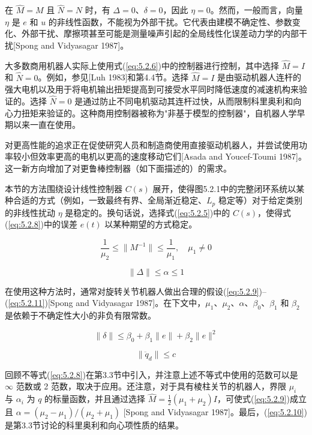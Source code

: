 \documentclass[UTF8,12pt,a4paper]{ctexart}
\begin{document}
在 $\hat{M} = M$ 且 $\hat{N} = N$ 时，有 $\Delta = 0$、$\delta = 0$，因此 $\eta = 0$。然而，一般而言，向量 $\eta$ 是 $e$ 和 $u$ 的非线性函数，不能视为外部干扰。它代表由建模不确定性、参数变化、外部干扰、摩擦项甚至可能是测量噪声引起的全局线性化误差动力学的内部干扰[Spong and Vidyasagar 1987]。

大多数商用机器人实际上使用式(\ref{eq:5.2.6})中的控制器进行控制，其中选择 $\hat{M} = I$ 和 $\hat{N} = 0$。例如，参见[Luh 1983]和第4.4节。选择 $\hat{M} = I$ 是由驱动机器人连杆的强大电机以及用于将电机输出扭矩提高到可接受水平同时降低速度的减速机构来验证的。选择 $\hat{N} = 0$ 是通过防止不同电机驱动其连杆过快，从而限制科里奥利和向心力扭矩来验证的。这种商用控制器被称为"非基于模型的控制器"，自机器人学早期以来一直在使用。

对更高性能的追求正在促使研究人员和制造商使用直接驱动机器人，并尝试使用功率较小但效率更高的电机以更高的速度移动它们[Asada and Youcef-Toumi 1987]。这一新方向增加了对更鲁棒控制器（如下面描述的）的需求。

本节的方法围绕设计线性控制器 $C(s)$ 展开，使得图5.2.1中的完整闭环系统以某种合适的方式（例如，一致最终有界、全局渐近稳定、$L_p$ 稳定等）对于给定类别的非线性扰动 $\eta$ 是稳定的。换句话说，选择式(\ref{eq:5.2.5})中的 $C(s)$，使得式(\ref{eq:5.2.8})中的误差 $e(t)$ 以某种期望的方式稳定。

\begin{equation}\label{eq:5.2.8}
\frac{1}{\mu_2} \leq \|M^{-1}\| \leq \frac{1}{\mu_1}, \quad \mu_1 \neq 0
\end{equation}

\begin{equation}\label{eq:5.2.9}
\|\Delta\| \leq \alpha \leq 1
\end{equation}

在使用这种方法时，通常对旋转关节机器人做出合理的假设(\ref{eq:5.2.9})--(\ref{eq:5.2.11})[Spong and Vidyasagar 1987]。在下文中，$\mu_1$、$\mu_2$、$\alpha$、$\beta_0$、$\beta_1$ 和 $\beta_2$ 是依赖于不确定性大小的非负有限常数。

\begin{equation}\label{eq:5.2.10}
\|\delta\| \leq \beta_0 + \beta_1\|e\| + \beta_2\|e\|^2
\end{equation}

\begin{equation}\label{eq:5.2.11}
\|\ddot{q}_d\| \leq c
\end{equation}

回顾不等式(\ref{eq:5.2.8})在第3.3节中引入，并注意上述不等式中使用的范数可以是 $\infty$ 范数或 2 范数，取决于应用。还注意，对于具有棱柱关节的机器人，界限 $\mu_i$ 与 $\alpha_i$ 为 $q$ 的标量函数，并且通过选择 $\hat{M} = \tfrac{1}{2}(\mu_1 + \mu_2)I$，可使式(\ref{eq:5.2.9})成立且 $\alpha = (\mu_2 - \mu_1)/(\mu_2 + \mu_1)$ [Spong and Vidyasagar 1987]。最后，(\ref{eq:5.2.10})是第3.3节讨论的科里奥利和向心项性质的结果。
\end{document}
